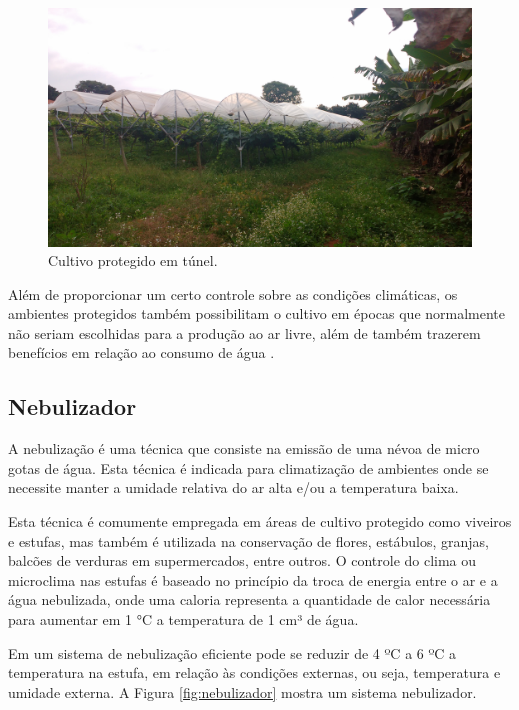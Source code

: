 \begin{figure}[H]
    \centering
    \includegraphics[scale=0.1]{04-figuras/tunel.jpg}
    \caption{Cultivo protegido em túnel.}
    \vspace{-\baselineskip}
    \label{fig:tunel}
\end{figure}

Além de proporcionar um certo controle sobre as condições climáticas, os ambientes protegidos também possibilitam o cultivo em épocas que normalmente não seriam escolhidas para a produção ao
ar livre, além de também trazerem benefícios em relação ao consumo de água \cite{purquerio2006ambiente_protegido}.


\subsection{Nebulizador}
A nebulização é uma técnica que consiste na emissão de uma névoa de micro gotas de água. Esta técnica é indicada para climatização de ambientes onde se necessite manter a umidade relativa do ar alta e/ou a temperatura baixa.

Esta técnica é comumente empregada em áreas de cultivo protegido como viveiros e estufas, mas também é utilizada na conservação de flores, estábulos, granjas, balcões de verduras em supermercados, entre outros. O controle do clima ou microclima nas estufas é baseado no princípio da troca de energia entre o ar e a água nebulizada, onde uma caloria representa a quantidade de calor necessária para aumentar em 1 °C a temperatura de 1 cm³ de água.

Em um sistema de nebulização eficiente pode se reduzir de 4 ºC a 6 ºC a temperatura na estufa, em relação às condições externas, ou seja, temperatura e umidade externa. A Figura \ref{fig:nebulizador} mostra um sistema nebulizador.

